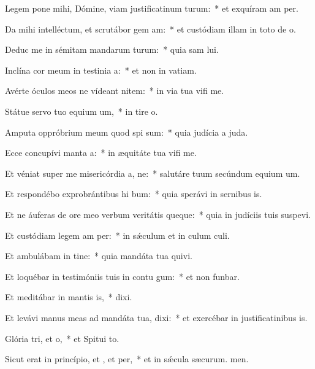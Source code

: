 \item Legem pone mihi, Dómine, viam justificatinum turum:~* et exquíram am per.
\item Da mihi intelléctum, et scrutábor gem am:~* et custódiam illam in toto de o.
\item Deduc me in sémitam mandarum turum:~* quia sam lui.
\item Inclína cor meum in testinia a:~* et non in vatiam.
\item Avérte óculos meos ne vídeant nitem:~* in via tua vifi me.
\item Státue servo tuo equium um,~* in tire o.
\item Amputa oppróbrium meum quod spi sum:~* quia judícia a juda.
\item Ecce concupívi manta a:~* in æquitáte tua vifi me.
\item Et véniat super me misericórdia a, ne:~* salutáre tuum secúndum equium um.
\item Et respondébo exprobrántibus hi bum:~* quia sperávi in sernibus is.
\item Et ne áuferas de ore meo verbum veritátis queque:~* quia in judíciis tuis suspevi.
\item Et custódiam legem am per:~* in sǽculum et in culum culi.
\item Et ambulábam in tine:~* quia mandáta tua quivi.
\item Et loquébar in testimóniis tuis in contu gum:~* et non funbar.
\item Et meditábar in mantis is,~*  dixi.
\item Et levávi manus meas ad mandáta tua,  dixi:~* et exercébar in justificatinibus is.
\item Glória tri, et o,~* et Spitui to.
\item Sicut erat in princípio, et , et per,~* et in sǽcula sæcurum. men.
